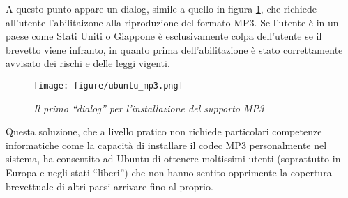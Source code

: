 A questo punto appare un dialog, simile a quello in figura \ref{dialog}, che richiede all'utente l'abilitaizone alla riproduzione del formato MP3. Se l'utente è in un paese come Stati Uniti o Giappone è esclusivamente colpa dell'utente se il brevetto viene infranto, in quanto prima dell'abilitazione è stato correttamente avvisato dei rischi e delle leggi vigenti.

\begin{figure}[htb]
	\begin{center}
		\texttt{[image: figure/ubuntu\_mp3.png]}\label{dialog}
	\end{center}
	\caption{\textit{Il primo ``dialog'' per l'installazione del supporto MP3}}
\end{figure}

Questa soluzione, che a livello pratico non richiede particolari competenze informatiche come la capacità di installare il codec MP3 personalmente nel sistema, ha consentito ad Ubuntu di ottenere moltissimi utenti (soprattutto in Europa e negli stati ``liberi'') che non hanno sentito opprimente la copertura brevettuale di altri paesi arrivare fino al proprio.
